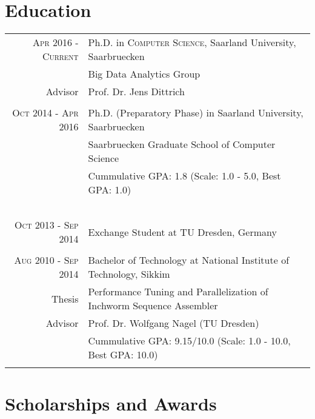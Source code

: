 \documentclass[a4paper,10pt]{article} %
\begin{document}
\section{Education}

\begin{tabular}{rl}	
\textsc{Apr 2016 - Current} & Ph.D. in \textsc{Computer Science}, Saarland University, Saarbruecken\\
& Big Data Analytics Group\\
Advisor & Prof. Dr. Jens Dittrich\\
&\\


\textsc{Oct 2014 - Apr 2016} & Ph.D. (Preparatory Phase) in Saarland University, Saarbruecken \\
& Saarbruecken Graduate School of Computer Science\\
&Cummulative GPA: 1.8 (Scale: 1.0 - 5.0, Best GPA: 1.0)\\\
&\\


\textsc{Oct 2013 - Sep 2014} & Exchange Student at TU Dresden, Germany\\
&\\



\textsc{Aug 2010 - Sep 2014} & Bachelor of Technology at National Institute of Technology, Sikkim\\
Thesis & Performance Tuning and Parallelization of Inchworm Sequence Assembler\\
Advisor & Prof. Dr. Wolfgang Nagel (TU Dresden)\\
& Cummulative GPA: 9.15/10.0 (Scale: 1.0 - 10.0, Best GPA: 10.0)\\
&\\

\end{tabular}


\section{Scholarships and Awards}
\end{document}
